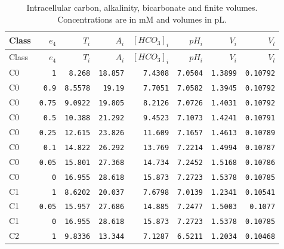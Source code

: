 \begingroup\scriptsize
\setlength{\tabcolsep}{3pt}
\begin{longtable}{lrrrrrrr}
\caption{Intracellular carbon, alkalinity, bicarbonate and finite volumes. Concentrations are in mM and volumes in pL.}\\
\toprule
Class & $e_4$ & $T_i$ & $A_i$ & $[HCO_3]_i$ & $pH_i$ & $V_i$ & $V_l$ \\
\midrule\endfirsthead
\toprule
Class & $e_4$ & $T_i$ & $A_i$ & $[HCO_3]_i$ & $pH_i$ & $V_i$ & $V_l$ \\
\midrule\endhead
\bottomrule\endfoot
C0 & \texttt{1} & \texttt{8.268} & \texttt{18.857} & \texttt{7.4308} & \texttt{7.0504} & \texttt{1.3899} & \texttt{0.10792} \\
C0 & \texttt{0.9} & \texttt{8.5578} & \texttt{19.19} & \texttt{7.7051} & \texttt{7.0582} & \texttt{1.3945} & \texttt{0.10792} \\
C0 & \texttt{0.75} & \texttt{9.0922} & \texttt{19.805} & \texttt{8.2126} & \texttt{7.0726} & \texttt{1.4031} & \texttt{0.10792} \\
C0 & \texttt{0.5} & \texttt{10.388} & \texttt{21.292} & \texttt{9.4523} & \texttt{7.1073} & \texttt{1.4241} & \texttt{0.10791} \\
C0 & \texttt{0.25} & \texttt{12.615} & \texttt{23.826} & \texttt{11.609} & \texttt{7.1657} & \texttt{1.4613} & \texttt{0.10789} \\
C0 & \texttt{0.1} & \texttt{14.822} & \texttt{26.292} & \texttt{13.769} & \texttt{7.2214} & \texttt{1.4994} & \texttt{0.10787} \\
C0 & \texttt{0.05} & \texttt{15.801} & \texttt{27.368} & \texttt{14.734} & \texttt{7.2452} & \texttt{1.5168} & \texttt{0.10786} \\
C0 & \texttt{0} & \texttt{16.955} & \texttt{28.618} & \texttt{15.873} & \texttt{7.2723} & \texttt{1.5378} & \texttt{0.10785} \\
C1 & \texttt{1} & \texttt{8.6202} & \texttt{20.037} & \texttt{7.6798} & \texttt{7.0139} & \texttt{1.2341} & \texttt{0.10541} \\
C1 & \texttt{0.05} & \texttt{15.957} & \texttt{27.686} & \texttt{14.885} & \texttt{7.2477} & \texttt{1.5003} & \texttt{0.1077} \\
C1 & \texttt{0} & \texttt{16.955} & \texttt{28.618} & \texttt{15.873} & \texttt{7.2723} & \texttt{1.5378} & \texttt{0.10785} \\
C2 & \texttt{1} & \texttt{9.8336} & \texttt{13.344} & \texttt{7.1287} & \texttt{6.5211} & \texttt{1.2034} & \texttt{0.10468} \\

\end{longtable}
